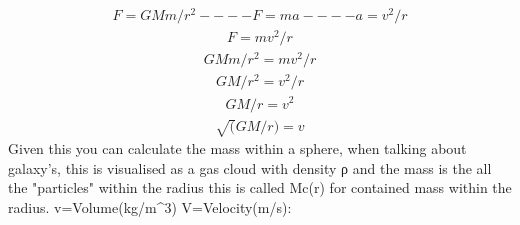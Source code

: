 \documentclass[10pt, twocolumn, twoside]{article}
\begin{document}
\begin{equation*}
\label{GaussE}
\begin{aligned}
F=GMm/r^2 ----F=ma ----a=v^2/r
\end{aligned}
\end{equation*}
\begin{equation*}
\label{GaussE}
\begin{aligned}
F=mv^2/r
\end{aligned}
\end{equation*}
\begin{equation*}
\label{GaussE}
\begin{aligned}
GMm/r^2=mv^2/r
\end{aligned}
\end{equation*}
\begin{equation*}
\label{GaussE}
\begin{aligned}
GM/r^2=v^2/r
\end{aligned}
\end{equation*}
\begin{equation*}
\label{GaussE}
\begin{aligned}
GM/r=v^2
\end{aligned}
\end{equation*}
\begin{equation*}
\label{GaussE}
\begin{aligned}
\sqrt(GM/r)=v
\end{aligned}
\end{equation*}
Given this you can calculate the mass within a sphere, when talking about galaxy's,
this is visualised as a gas cloud with density ρ and the mass is the all the "particles"
within the radius this is called Mc(r) for contained mass within the radius.
v=Volume(kg/m^3) V=Velocity(m/s):
\end{document}
